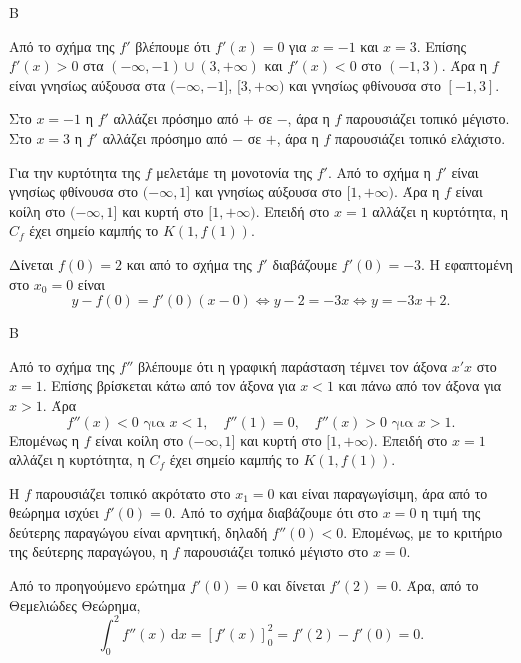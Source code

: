 \begin{thema}{Β}
\begin{erwthma}
\item Από το σχήμα της $f'$ βλέπουμε ότι $f'(x)=0$ για $x=-1$ και $x=3$. Επίσης $f'(x)>0$ στα $(-\infty,-1)\cup(3,+\infty)$ και $f'(x)<0$ στο $(-1,3)$. Άρα η $f$ είναι γνησίως αύξουσα στα $(-\infty,-1]$, $[3,+\infty)$ και γνησίως φθίνουσα στο $[-1,3]$.

\item Στο $x=-1$ η $f'$ αλλάζει πρόσημο από $+$ σε $-$, άρα η $f$ παρουσιάζει τοπικό μέγιστο. Στο $x=3$ η $f'$ αλλάζει πρόσημο από $-$ σε $+$, άρα η $f$ παρουσιάζει τοπικό ελάχιστο.

\item Για την κυρτότητα της $f$ μελετάμε τη μονοτονία της $f'$. Από το σχήμα η $f'$ είναι γνησίως φθίνουσα στο $(-\infty,1]$ και γνησίως αύξουσα στο $[1,+\infty)$. Άρα η $f$ είναι κοίλη στο $(-\infty,1]$ και κυρτή στο $[1,+\infty)$. Επειδή στο $x=1$ αλλάζει η κυρτότητα, η $C_f$ έχει σημείο καμπής το $K(1,f(1))$.

\item Δίνεται $f(0)=2$ και από το σχήμα της $f'$ διαβάζουμε $f'(0)=-3$. Η εφαπτομένη στο $x_0=0$ είναι
\[
y-f(0)=f'(0)(x-0)\Leftrightarrow y-2=-3x\Leftrightarrow y=-3x+2.
\]
\end{erwthma}
\end{thema}



\begin{thema}{Β}
\begin{erwthma}
\item Από το σχήμα της $f''$ βλέπουμε ότι η γραφική παράσταση τέμνει τον άξονα $x'x$ στο $x=1$. Επίσης βρίσκεται κάτω από τον άξονα για $x<1$ και πάνω από τον άξονα για $x>1$. Άρα
\[
f''(x)<0 \text{ για } x<1,\quad f''(1)=0,\quad f''(x)>0 \text{ για } x>1.
\]
Επομένως η $f$ είναι κοίλη στο $(-\infty,1]$ και κυρτή στο $[1,+\infty)$. Επειδή στο $x=1$ αλλάζει η κυρτότητα, η $C_f$ έχει σημείο καμπής το $K(1,f(1))$.

\item Η $f$ παρουσιάζει τοπικό ακρότατο στο $x_1=0$ και είναι παραγωγίσιμη, άρα από το θεώρημα  ισχύει $f'(0)=0$. Από το σχήμα διαβάζουμε ότι στο $x=0$ η τιμή της δεύτερης παραγώγου είναι αρνητική, δηλαδή $f''(0)<0$. Επομένως, με το κριτήριο της δεύτερης παραγώγου, η $f$ παρουσιάζει τοπικό μέγιστο στο $x=0$.

\item Από το προηγούμενο ερώτημα $f'(0)=0$ και δίνεται $f'(2)=0$. Άρα, από το Θεμελιώδες Θεώρημα,
\[
\int_0^2 f''(x)\,\mathrm{d}x=\left[f'(x)\right]_0^2=f'(2)-f'(0)=0.
\]
\end{erwthma}
\end{thema}

